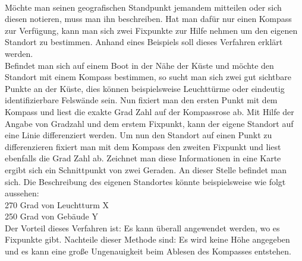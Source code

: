 \newpage
{}
\\Möchte man seinen geografischen Standpunkt jemandem mitteilen oder sich diesen notieren, muss man ihn beschreiben. Hat man dafür nur einen Kompass zur Verfügung, kann man sich zwei Fixpunkte zur Hilfe nehmen um den eigenen Standort zu bestimmen.
Anhand eines Beispiels soll dieses Verfahren erklärt werden. 
\\Befindet man sich auf einem Boot in der Nähe der Küste und möchte den Standort mit einem Kompass bestimmen, so sucht man sich zwei gut sichtbare Punkte an der Küste, dies können beispielsweise Leuchttürme oder eindeutig identifizierbare Felswände sein. Nun fixiert man den ersten Punkt mit dem Kompass und liest die exakte Grad Zahl auf der Kompassrose ab. Mit Hilfe der Angabe von Gradzahl und dem erstem Fixpunkt, kann der eigene Standort auf eine Linie differenziert werden. Um nun den Standort auf einen Punkt zu differenzieren fixiert man mit dem Kompass den zweiten Fixpunkt und liest ebenfalls die Grad Zahl ab. Zeichnet man diese Informationen in eine Karte ergibt sich ein Schnittpunkt von zwei Geraden. An dieser Stelle befindet man sich. Die Beschreibung des eigenen Standortes könnte beispielsweise wie folgt aussehen:
\\270 Grad von Leuchtturm X
\\250 Grad von Gebäude Y
\\Der Vorteil dieses Verfahren ist: Es kann überall angewendet werden, wo es Fixpunkte gibt.
Nachteile dieser Methode sind: Es wird keine Höhe angegeben und es kann eine große Ungenauigkeit beim Ablesen des Kompasses entstehen.

